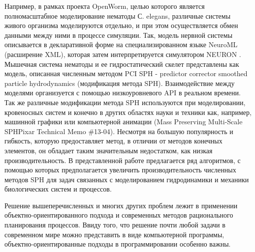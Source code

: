Например, в рамках проекта OpenWorm, целью которого является полномасштабное моделирование нематоды  С. elegans, различные системы живого организма моделируются отдельно, и при этом осуществляется обмен данными между ними в процессе симуляции. Так, модель нервной системы описывается в декларативной  форме на специализированном языке  NeuroML (расширение XML), которая затем интерпретируется симулятором  NEURON \cite{Carnevale2006}. Мышечная система нематоды и ее гидростатический скелет представлены как модель, описанная численным методом  PCI SPH - predictor corrector smoothed particle hydrodynamics (модификация метода SPH). Взаимодействие между моделями организуется с помощью низкоуровневого API в реальном времени. Так же различные модификации метода SPH используются при моделировании, кровеносных систем \cite{Caballero2017} и конечно в других областях науки и техники как, например, машинной графики  или компьютерной анимации \cite{Solenthaler2013} (Mass Preserving Multi-Scale SPHPixar Technical Memo \#13-04). Несмотря на большую популярность и гибкость, которую предоставляет метод, в отличии от методов конечных элементов, он обладает таким значительным недостатком, как низкая производительность. В представленной работе  предлагается ряд алгоритмов, с помощью которых предполагается увеличить производительность численных методов SPH для задач связанных с моделированием гидродинамики и механики биологических систем и процессов.

Решение вышеперечисленных и многих других проблем лежит в применении объектно-ориентированного подхода и современных методов рационального планирования процессов. Ввиду того, что решение почти любой задачи в современном мире можно представить в виде компьютерной программы, объектно-ориентированные подходы в программировании особенно важны.



